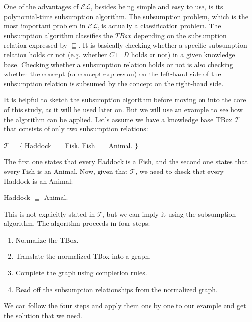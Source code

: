One of the advantages of $\mathcal{EL}$, besides being simple and easy to use, is its polynomial-time subsumption algorithm. The subsumption problem, which is the most important problem in $\mathcal{EL}$, is actually a classification problem. The subsumption algorithm classifies the $TBox$ depending on the subsumption relation expressed by $\sqsubseteq$. It is basically checking whether a specific subsumption relation holds or not (e.g. whether $C \sqsubseteq D$ holds or not) in a given knowledge base. Checking whether a subsumption relation holds or not is also checking whether the concept (or concept expression) on the left-hand side of the subsumption relation is subsumed by the concept on the right-hand side.

It is helpful to sketch the subsumption algorithm before moving on into the core of this study, as it will be used later on. But we will use an example to see how the algorithm can be applied. Let's assume we have a knowledge base TBox $\mathcal{T}$ that consists of only two subsumption relations:
\begin{center}
$\mathcal{T}$ = $\lbrace$ Haddock $\sqsubseteq$ Fish, Fish $\sqsubseteq$ Animal. $\rbrace$
\end{center}
The first one states that every Haddock is a Fish, and the second one states that every Fish is an Animal. Now, given that $\mathcal{T}$, we need to check that every Haddock is an Animal:
\begin{center}
Haddock $\sqsubseteq$ Animal.
\end{center}
This is not explicitly stated in $\mathcal{T}$, but we can imply it using the subsumption algorithm. The algorithm proceeds in four steps:
\begin{enumerate}
\item Normalize the TBox.
\item Translate the normalized TBox into a graph.
\item Complete the graph using completion rules.
\item Read off the subsumption relationships from the normalized graph.
\end{enumerate}
We can follow the four steps and apply them one by one to our example and get the solution that we need.
